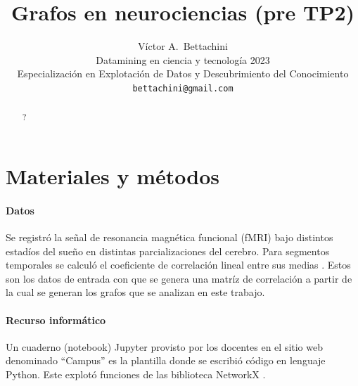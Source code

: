 \documentclass{article}
\title{Grafos en neurociencias (pre TP2)}
\author{
  Víctor A.~Bettachini\\ %
  Datamining en ciencia y tecnología 2023\\
  Especialización en Explotación de Datos y Descubrimiento del Conocimiento\\
  \texttt{bettachini@gmail.com}
}
\begin{document}
\maketitle


\begin{abstract}
?
\end{abstract}





\section{Materiales y métodos}

\paragraph{Datos}
Se registró la señal de resonancia magnética funcional (fMRI) bajo distintos estadíos del sueño en distintas parcializaciones del cerebro. 
Para segmentos temporales se calculó el coeficiente de correlación lineal entre sus medias \cite{tagliazucchi_large-scale_2013}.
Estos son los datos de entrada con que se genera una matríz de correlación a partir de la cual se generan los grafos que se analizan en este trabajo.

\paragraph{Recurso informático} 
Un cuaderno (notebook) Jupyter provisto por los docentes en el sitio web denominado ``Campus'' \cite{kamienkowski_curso_2023} es la plantilla donde se escribió código en lenguaje Python.
Este explotó funciones de las biblioteca NetworkX \cite{hagberg_exploring_2008}.
\end{document}
